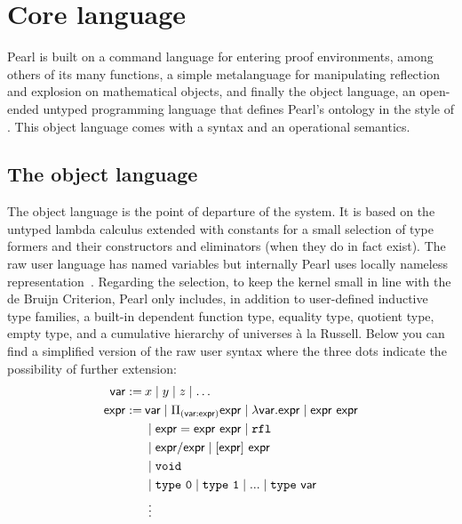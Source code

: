 \documentclass[a4paper]{article}
\begin{document}





\section{Core language} \label{sec:language}

Pearl is built on a command language for entering proof environments, among others of its many functions, a simple metalanguage for manipulating reflection and explosion on mathematical objects, and finally the object language, an open-ended untyped programming language that defines Pearl's ontology in the style of \cite[\S11]{bentzen2026book}. This object language comes with a syntax and an operational semantics. 

\subsection{The object language}

The object language is the point of departure of the system. It is based on the untyped lambda calculus extended with constants for a small selection of type formers and their constructors and eliminators (when they do in fact exist). The raw user language has named variables but internally Pearl uses locally nameless representation~\cite{chargueraud2012locally}. 
Regarding the selection, to keep the kernel small in line with the de Bruijn Criterion, Pearl only includes, in addition to user-defined inductive type families, a built-in dependent function type, equality type, quotient type, empty type, and a cumulative hierarchy of universes à la Russell. Below you can find a simplified version of the raw user syntax where the three dots indicate the possibility of further extension: 
\begin{align*}
	\mathsf{var} :=\:& {x} \mid {y} \mid {z} \mid \ldots \\ 
	\expr :=\:& \var  \mid \Pi_{(\var : \expr)} \expr \mid  \fun{\var}\expr \mid \expr\ \expr \\
	& \mid \idtype{\expr}{\expr}{\expr} \mid  \rfl \\ %
	& \mid \expr / \expr \mid [\expr]\ \expr  \\
	& \mid \void \\ %
	& \mid \type \ \mathtt{0} \mid \type \ \mathtt{1} \mid ... \mid \type \ \var  \\
	& \; \vdots
\end{align*}
\end{document}

